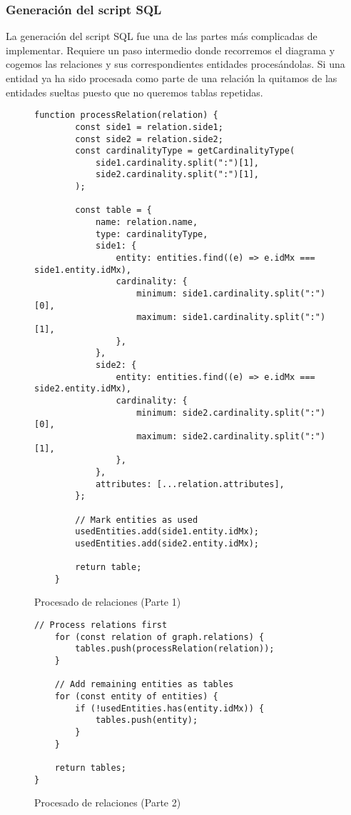 \subsubsection{Generación del script SQL}
La generación del script SQL fue una de las partes más complicadas de implementar. Requiere un paso intermedio donde recorremos el diagrama y cogemos las relaciones y sus correspondientes entidades procesándolas.
Si una entidad ya ha sido procesada como parte de una relación la quitamos de las entidades sueltas puesto que no queremos tablas repetidas.


\begin{figure}[h]
\lstset{breaklines=true, basicstyle=\footnotesize}
\begin{lstlisting}[frame=single]
function processRelation(relation) {
        const side1 = relation.side1;
        const side2 = relation.side2;
        const cardinalityType = getCardinalityType(
            side1.cardinality.split(":")[1],
            side2.cardinality.split(":")[1],
        );

        const table = {
            name: relation.name,
            type: cardinalityType,
            side1: {
                entity: entities.find((e) => e.idMx === side1.entity.idMx),
                cardinality: {
                    minimum: side1.cardinality.split(":")[0],
                    maximum: side1.cardinality.split(":")[1],
                },
            },
            side2: {
                entity: entities.find((e) => e.idMx === side2.entity.idMx),
                cardinality: {
                    minimum: side2.cardinality.split(":")[0],
                    maximum: side2.cardinality.split(":")[1],
                },
            },
            attributes: [...relation.attributes],
        };

        // Mark entities as used
        usedEntities.add(side1.entity.idMx);
        usedEntities.add(side2.entity.idMx);

        return table;
    }
\end{lstlisting}
\caption{Procesado de relaciones (Parte 1)}
\end{figure}

\clearpage

\begin{figure}[h]
\lstset{breaklines=true, basicstyle=\footnotesize}
\begin{lstlisting}[frame=single]
    // Process relations first
    for (const relation of graph.relations) {
        tables.push(processRelation(relation));
    }

    // Add remaining entities as tables
    for (const entity of entities) {
        if (!usedEntities.has(entity.idMx)) {
            tables.push(entity);
        }
    }

    return tables;
}
\end{lstlisting}
\caption{Procesado de relaciones (Parte 2)}
\end{figure}


